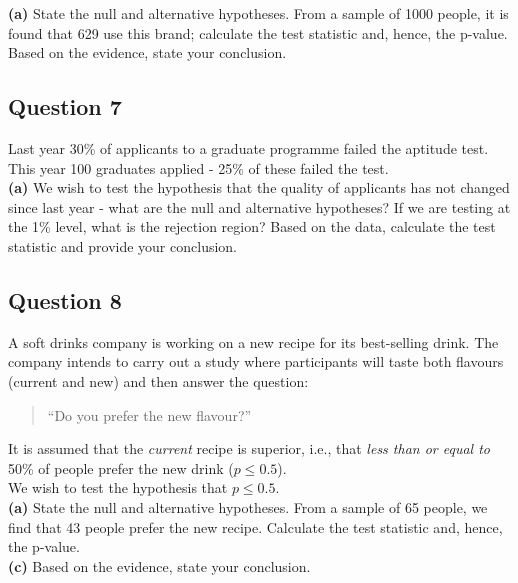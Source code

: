 \documentclass[12pt]{article}
\begin{document}
{\bf(a)} State the null and alternative hypotheses.  From a sample of 1000 people, it is found that 629 use this brand; calculate the test statistic and, hence, the p-value.  Based on the evidence, state your conclusion.



\subsection*{Question 7}
Last year 30\% of applicants to a graduate programme failed the aptitude test. This year 100 graduates applied - 25\% of these failed the test.\\[-0.2cm]

{\bf(a)} We wish to test the hypothesis that the quality of applicants has not changed since last year - what are the null and alternative hypotheses?  If we are testing at the 1\% level, what is the rejection region?  Based on the data, calculate the test statistic and provide your conclusion.





\subsection*{Question 8}
A soft drinks company is working on a new recipe for its best-selling drink. The company intends to carry out a study where participants will taste both flavours (current and new) and then answer the question:
    \begin{quotation}
    ``Do you prefer the new flavour?''
    \end{quotation}
    It is assumed that the \emph{current} recipe is superior, i.e., that \emph{less than or equal to} 50\% of people prefer the new drink ($p \le 0.5$).\\[0.4cm]
    We wish to test the hypothesis that $p \le 0.5$.\\[-0.2cm]

{\bf(a)} State the null and alternative hypotheses.  From a sample of 65 people, we find that 43 people prefer the new recipe. Calculate the test statistic and, hence, the p-value. \quad \\ {\bf(c)} Based on the evidence, state your conclusion.
\end{document}
